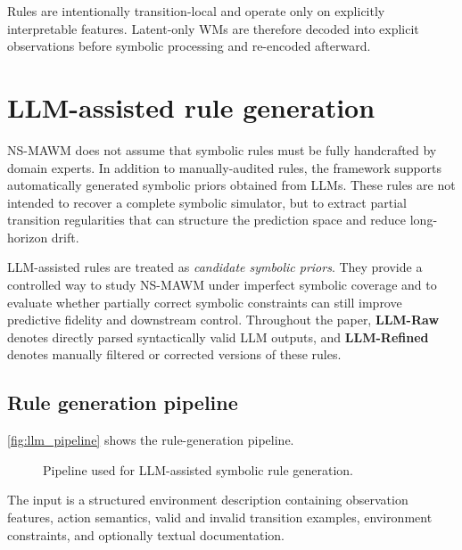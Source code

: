\documentclass{article}
\theoremstyle{plain}
\theoremstyle{definition}
\theoremstyle{remark}
\begin{document}
Rules are intentionally transition-local and operate only on explicitly
interpretable features. Latent-only WMs are therefore decoded into
explicit observations before symbolic processing and re-encoded afterward.

\section{LLM-assisted rule generation}
\label{app:llm-rule-generation}

NS-MAWM does not assume that symbolic rules must be fully handcrafted by domain
experts. In addition to manually-audited rules, the framework supports
automatically generated symbolic priors obtained from LLMs. These rules are not intended to recover a complete symbolic simulator, but to
extract partial transition regularities that can structure the prediction space
and reduce long-horizon drift.

LLM-assisted rules are treated as \emph{candidate symbolic priors}.
They provide a controlled way to study NS-MAWM under imperfect symbolic
coverage and to evaluate whether partially correct symbolic constraints can
still improve predictive fidelity and downstream control. Throughout the paper, \textbf{LLM-Raw} denotes directly parsed syntactically valid LLM outputs, and \textbf{LLM-Refined} denotes manually filtered or corrected versions of these rules.

\subsection{Rule generation pipeline}

\autoref{fig:llm_pipeline} shows the rule-generation pipeline.

\begin{figure}[h!]
  \centering
  \caption{
    Pipeline used for LLM-assisted symbolic rule generation.
  }
  \label{fig:llm_pipeline}
\end{figure}

The input is a structured environment description containing observation features, action semantics, valid and invalid transition examples, environment constraints, and optionally textual documentation.
\end{document}
